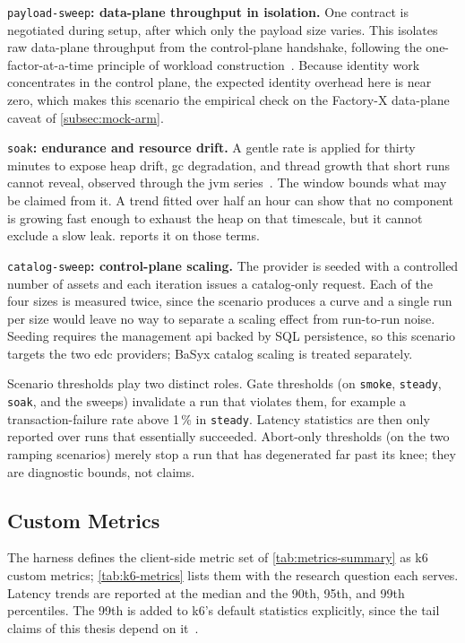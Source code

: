 \texttt{payload-sweep}\textbf{: data-plane throughput in isolation.} One contract is negotiated during setup, after which only the payload size varies. This isolates raw data-plane throughput from the control-plane handshake, following the one-factor-at-a-time principle of workload construction~\citep{kistowski2015benchmark}. Because identity work concentrates in the control plane, the expected identity overhead here is near zero, which makes this scenario the empirical check on the Factory-X data-plane caveat of \cref{subsec:mock-arm}.

\texttt{soak}\textbf{: endurance and resource drift.} A gentle rate is applied for thirty minutes to expose heap drift, \gls{gc} degradation, and thread growth that short runs cannot reveal, observed through the \gls{jvm} series~\citep{gregg2012thinking}. The window bounds what may be claimed from it. A trend fitted over half an hour can show that no component is growing fast enough to exhaust the heap on that timescale, but it cannot exclude a slow leak.  reports it on those terms.

\texttt{catalog-sweep}\textbf{: control-plane scaling.} The provider is seeded with a controlled number of assets and each iteration issues a catalog-only request. Each of the four sizes is measured twice, since the scenario produces a curve and a single run per size would leave no way to separate a scaling effect from run-to-run noise. Seeding requires the management \gls{api} backed by SQL persistence, so this scenario targets the two \gls{edc} providers; BaSyx catalog scaling is treated separately.

Scenario thresholds play two distinct roles. Gate thresholds (on \texttt{smoke}, \texttt{steady}, \texttt{soak}, and the sweeps) invalidate a run that violates them, for example a transaction-failure rate above 1\,\% in \texttt{steady}. Latency statistics are then only reported over runs that essentially succeeded. Abort-only thresholds (on the two ramping scenarios) merely stop a run that has degenerated far past its knee; they are diagnostic bounds, not claims.

\subsection{Custom Metrics}\label{subsec:custom-metrics}

The harness defines the client-side metric set of \cref{tab:metrics-summary} as k6 custom metrics; \cref{tab:k6-metrics} lists them with the research question each serves. Latency trends are reported at the median and the 90th, 95th, and 99th percentiles. The 99th is added to k6's default statistics explicitly, since the tail claims of this thesis depend on it~\citep{dean2013tail}.


